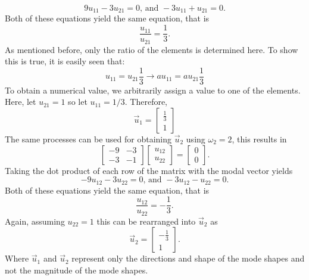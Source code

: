 \documentclass[12pt,letter]{article}
\begin{document}
\begin{example}
\begin{equation}
 9u_{11} -3u_{21}=0 \text{, and } -3u_{11} + u_{21}=0.
\end{equation}
Both of these equations yield the same equation, that is
\begin{equation}
 \frac{u_{11}}{u_{21}} =\frac{1}{3}.
\end{equation}
As mentioned before, only the ratio of the elements is determined here. To show this is true, it is easily seen that:
\begin{equation}
 u_{11}=u_{21}\frac{1}{3} \rightarrow  a u_{11}= a u_{21}\frac{1}{3} 
\end{equation}
To obtain a numerical value, we arbitrarily assign a value to one of the elements. Here, let $u_{21}=1$ so  let $u_{11}=1/3$. Therefore, 
\begin{equation}
 \vec{u}_1 = \begin{bmatrix} \frac{1}{3}\\ 1\end{bmatrix}
\end{equation}
The same processes can be used for obtaining $\vec{u}_2$ using $\omega_2=2$, this results in
\begin{equation}
 \begin{bmatrix} -9 & -3 \\    -3  & -1 \end{bmatrix} 
 \begin{bmatrix} u_{12}\\ u_{22}\end{bmatrix}=\begin{bmatrix} 0\\ 0\end{bmatrix}.
\end{equation}
Taking the dot product of each row of the matrix with the modal vector yields
\begin{equation}
 -9u_{12} -3u_{22}=0 \text{, and } -3u_{12} - u_{22}=0.
\end{equation}
Both of these equations yield the same equation, that is
\begin{equation}
 \frac{u_{12}}{u_{22}} =-\frac{1}{3}.
\end{equation}
Again, assuming $u_{22}=1$  this can be rearranged into $\vec{u}_2$ as
\begin{equation}
 \vec{u}_2 = \begin{bmatrix} -\frac{1}{3}\\ 1\end{bmatrix}.
\end{equation}
Where $\vec{u}_1$ and $\vec{u}_2$ represent only the directions and shape of the mode shapes and not the magnitude of the mode shapes. 


\end{example}
\end{document}
